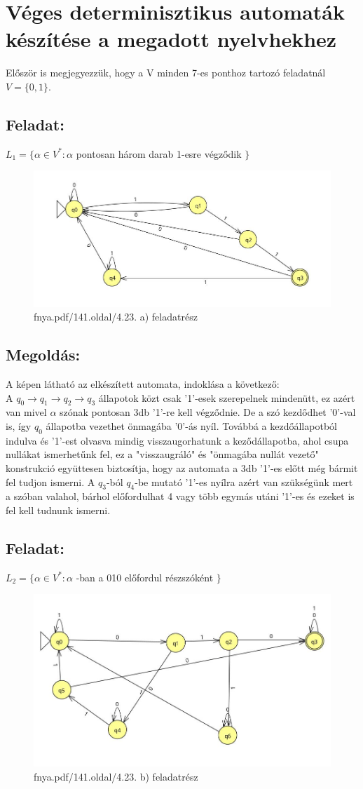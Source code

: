 \documentclass[12pt]{article}
\begin{document}
\section{Véges determinisztikus automaták készítése a megadott nyelvhekhez}
Először is megjegyezzük, hogy a V minden 7-es ponthoz tartozó feladatnál $V=\{0,1\}$.
\subsection{Feladat:}
$ L_1 = \{ \alpha \in V^* : \alpha $ pontosan három darab 1-esre végződik $\}$
\begin{figure}[h]
  \centering
  \includegraphics[width=0.7\linewidth]{img/a.jpg} 
  \caption{fnya.pdf/141.oldal/4.23. a) feladatrész}
  \label{fig:your_label}
\end{figure}
\subsection{Megoldás:}
A képen látható az elkészített automata, indoklása a következő: \\
A $q_0 \rightarrow q_1 \rightarrow q_2 \rightarrow q_3$ állapotok közt csak '1'-esek szerepelnek mindenütt, ez
azért van mivel $\alpha$ szónak pontosan 3db '1'-re kell végződnie. De a szó kezdődhet '0'-val is, így $q_0$
állapotba vezethet önmagába '0'-ás nyíl. Továbbá a kezdőállapotból indulva és '1'-est olvasva mindig
visszaugorhatunk a keződállapotba, ahol csupa nullákat ismerhetűnk fel, ez a "visszaugráló" és "önmagába nullát
vezető" konstrukció együttesen biztosítja, hogy az automata a 3db '1'-es előtt még bármit fel tudjon ismerni.
A $q_3$-ból $q_4$-be mutató '1'-es nyílra azért van szükségünk mert a szóban valahol, bárhol előfordulhat 4 vagy 
több egymás utáni '1'-es és ezeket is fel kell tudnunk ismerni.
\subsection{Feladat:}
$ L_2 = \{ \alpha \in V^* : \alpha $ -ban a 010 előfordul részszóként $\}$
\begin{figure}[h]
  \centering
  \includegraphics[width=0.7\linewidth]{img/b.jpg} 
  \caption{fnya.pdf/141.oldal/4.23. b) feladatrész}
  \label{fig:your_label}
\end{figure}
\end{document}
